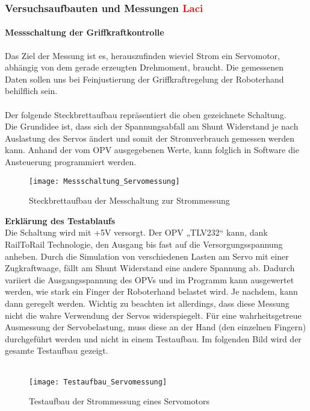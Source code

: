 \documentclass[titlepage,12pt,twoside]{article}
\begin{document}
\subsubsection{Versuchsaufbauten und Messungen \textcolor{red}{Laci}}
\paragraph{Messschaltung der Griffkraftkontrolle}
\hfill \break
\hfill \break
Das Ziel der Messung ist es, herauszufinden wieviel Strom ein Servomotor, abhängig von dem gerade erzeugten Drehmoment, 
braucht. Die gemessenen Daten sollen uns bei Feinjustierung der Griffkraftregelung der Roboterhand behilflich sein. \\
\\
Der folgende Steckbrettaufbau repräsentiert die oben gezeichnete Schaltung. \\
Die Grundidee ist, dass sich der Spannungsabfall am Shunt Widerstand je nach Auslastung des Servos ändert und somit der 
Stromverbrauch gemessen werden kann. Anhand der vom OPV ausgegebenen Werte, kann folglich in Software die Ansteuerung programmiert 
werden. \\
\begin{figure}[H]
	\begin{center}
		\scalebox{1.2}
		{\texttt{[image: Messschaltung\_Servomessung]}}
		\caption{Steckbrettaufbau der Messchaltung zur Strommessung}
		\label{fig:Messschaltung_Servomessung}		
	\end{center}
\end{figure}
\hfill \break
\textbf{Erklärung des Testablaufs}\\
Die Schaltung wird mit +5V versorgt. Der OPV „TLV232“ kann, dank RailToRail Technologie, den Ausgang bis fast auf die 
Versorgungsspannung anheben. Durch die Simulation von verschiedenen Lasten am Servo mit einer Zugkraftwaage, fällt am Shunt 
Widerstand eine andere Spannung ab. Dadurch variiert die Ausgangsspannung des OPVs und im Programm kann ausgewertet werden, 
wie stark ein Finger der Roboterhand belastet wird. Je nachdem, kann dann geregelt werden. 
Wichtig zu beachten ist allerdings, dass diese Messung nicht die wahre Verwendung der Servos widerspiegelt. Für eine 
wahrheitsgetreue Ausmessung der Servobelastung, muss diese an der Hand (den einzelnen Fingern) durchgeführt werden und nicht 
in einem Testaufbau. Im folgenden Bild wird der gesamte Testaufbau gezeigt. \\
\\
\begin{figure}[H]
	\begin{center}
		\scalebox{1.2}
		{\texttt{[image: Testaufbau\_Servomessung]}}
		\caption{Testaufbau der Strommessung eines Servomotors}
		\label{fig:Testaufbau_Servomessung}		
	\end{center}
\end{figure}
\end{document}
